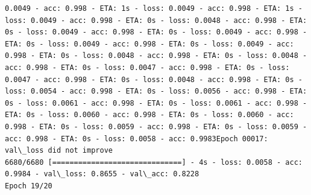 \documentclass[11pt]{article}
\begin{document}
\begin{Verbatim}[commandchars=\\\{\}]
0.0049 - acc: 0.998 - ETA: 1s - loss: 0.0049 - acc: 0.998 - ETA: 1s - loss: 0.0049 - acc: 0.998 - ETA: 0s - loss: 0.0048 - acc: 0.998 - ETA: 0s - loss: 0.0049 - acc: 0.998 - ETA: 0s - loss: 0.0049 - acc: 0.998 - ETA: 0s - loss: 0.0049 - acc: 0.998 - ETA: 0s - loss: 0.0049 - acc: 0.998 - ETA: 0s - loss: 0.0048 - acc: 0.998 - ETA: 0s - loss: 0.0048 - acc: 0.998 - ETA: 0s - loss: 0.0047 - acc: 0.998 - ETA: 0s - loss: 0.0047 - acc: 0.998 - ETA: 0s - loss: 0.0048 - acc: 0.998 - ETA: 0s - loss: 0.0054 - acc: 0.998 - ETA: 0s - loss: 0.0056 - acc: 0.998 - ETA: 0s - loss: 0.0061 - acc: 0.998 - ETA: 0s - loss: 0.0061 - acc: 0.998 - ETA: 0s - loss: 0.0060 - acc: 0.998 - ETA: 0s - loss: 0.0060 - acc: 0.998 - ETA: 0s - loss: 0.0059 - acc: 0.998 - ETA: 0s - loss: 0.0059 - acc: 0.998 - ETA: 0s - loss: 0.0058 - acc: 0.9983Epoch 00017: val\_loss did not improve
6680/6680 [==============================] - 4s - loss: 0.0058 - acc: 0.9984 - val\_loss: 0.8655 - val\_acc: 0.8228
Epoch 19/20

\end{Verbatim}
\end{document}
